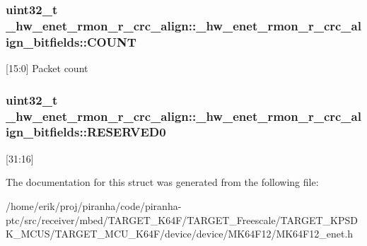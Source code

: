 \subsubsection[{\texorpdfstring{C\+O\+U\+NT}{COUNT}}]{\setlength{\rightskip}{0pt plus 5cm}uint32\+\_\+t \+\_\+hw\+\_\+enet\+\_\+rmon\+\_\+r\+\_\+crc\+\_\+align\+::\+\_\+hw\+\_\+enet\+\_\+rmon\+\_\+r\+\_\+crc\+\_\+align\+\_\+bitfields\+::\+C\+O\+U\+NT}\hypertarget{struct__hw__enet__rmon__r__crc__align_1_1__hw__enet__rmon__r__crc__align__bitfields_a3a875120ccbbf565e0b6087a3a97ef5f}{}\label{struct__hw__enet__rmon__r__crc__align_1_1__hw__enet__rmon__r__crc__align__bitfields_a3a875120ccbbf565e0b6087a3a97ef5f}
\mbox{[}15\+:0\mbox{]} Packet count 
\subsubsection[{\texorpdfstring{R\+E\+S\+E\+R\+V\+E\+D0}{RESERVED0}}]{\setlength{\rightskip}{0pt plus 5cm}uint32\+\_\+t \+\_\+hw\+\_\+enet\+\_\+rmon\+\_\+r\+\_\+crc\+\_\+align\+::\+\_\+hw\+\_\+enet\+\_\+rmon\+\_\+r\+\_\+crc\+\_\+align\+\_\+bitfields\+::\+R\+E\+S\+E\+R\+V\+E\+D0}\hypertarget{struct__hw__enet__rmon__r__crc__align_1_1__hw__enet__rmon__r__crc__align__bitfields_a85e9457e3d88323f752c8ec5fced64f9}{}\label{struct__hw__enet__rmon__r__crc__align_1_1__hw__enet__rmon__r__crc__align__bitfields_a85e9457e3d88323f752c8ec5fced64f9}
\mbox{[}31\+:16\mbox{]} 

The documentation for this struct was generated from the following file\+:\begin{DoxyCompactItemize}
\item 
/home/erik/proj/piranha/code/piranha-\/ptc/src/receiver/mbed/\+T\+A\+R\+G\+E\+T\+\_\+\+K64\+F/\+T\+A\+R\+G\+E\+T\+\_\+\+Freescale/\+T\+A\+R\+G\+E\+T\+\_\+\+K\+P\+S\+D\+K\+\_\+\+M\+C\+U\+S/\+T\+A\+R\+G\+E\+T\+\_\+\+M\+C\+U\+\_\+\+K64\+F/device/device/\+M\+K64\+F12/M\+K64\+F12\+\_\+enet.\+h\end{DoxyCompactItemize}
